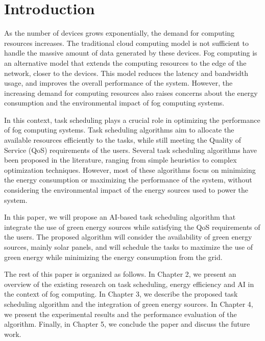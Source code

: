 \chapter{Introduction}

As the number of devices grows exponentially, the demand for computing resources increases. The traditional cloud
computing model is not sufficient to handle the massive amount of data generated by these devices. Fog computing is an
alternative model that extends the computing resources to the edge of the network, closer to the devices. This model
reduces the latency and bandwidth usage, and improves the overall performance of the system. However, the increasing
demand for computing resources also raises concerns about the energy consumption and the environmental impact of fog
computing systems.

In this context, task scheduling plays a crucial role in optimizing the performance of fog computing systems. Task
scheduling algorithms aim to allocate the available resources efficiently to the tasks, while still meeting the Quality
of Service (QoS) requirements of the users. Several task scheduling algorithms have been proposed in the literature,
ranging from simple heuristics to complex optimization techniques. However, most of these algorithms focus on
minimizing the energy consumption or maximizing the performance of the system, without considering the environmental
impact of the energy sources used to power the system.

In this paper, we will propose an AI-based task scheduling algorithm that integrate the use of green energy sources
while satisfying the QoS requirements of the users. The proposed algorithm will consider the availability of green
energy sources, mainly solar panels, and will schedule the tasks to maximize the use of green energy while minimizing
the energy consumption from the grid.

The rest of this paper is organized as follows. In Chapter 2, we present an overview of the existing research on task
scheduling, energy efficiency and AI in the context of fog computing. In Chapter 3, we describe the proposed task
scheduling algorithm and the integration of green energy sources. In Chapter 4, we present the experimental results
and the performance evaluation of the algorithm. Finally, in Chapter 5, we conclude the paper and discuss the future
work.